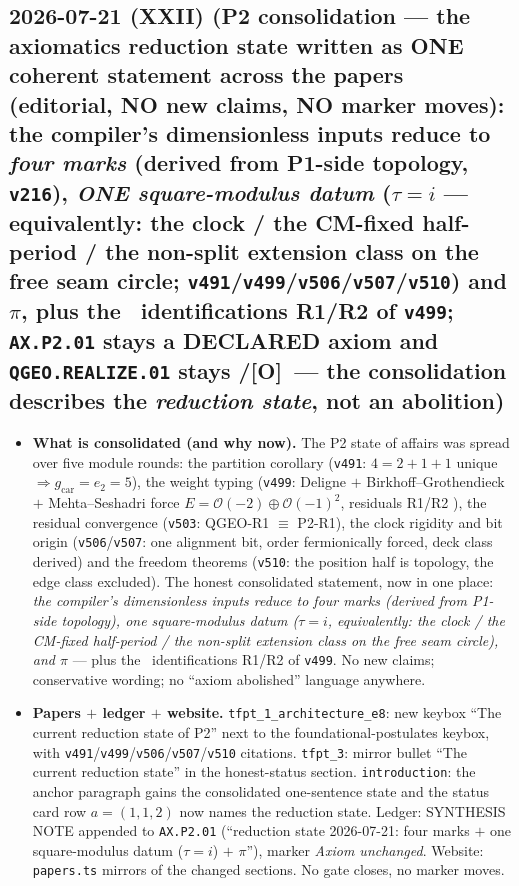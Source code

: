\documentclass[11pt]{article}
\providecommand{\mO}{\textbf{[O]}}\providecommand{\mX}{\textbf{[X]}}
\providecommand{\gcar}{g_{\mathrm{car}}}\providecommand{\Nfam}{N_{\mathrm{fam}}}
\begin{document}
\subsection*{2026-07-21 (XXII) (P2 consolidation --- the axiomatics reduction state written as ONE coherent statement across the papers (editorial, NO new claims, NO marker moves): the compiler's dimensionless inputs reduce to \emph{four marks} (derived from P1-side topology, \texttt{v216}), \emph{ONE square-modulus datum} ($\tau=i$ --- equivalently: the clock / the CM-fixed half-period / the non-split extension class on the free seam circle; \texttt{v491}/\texttt{v499}/\texttt{v506}/\texttt{v507}/\texttt{v510}) and $\pi$, plus the \mC\ identifications R1/R2 of \texttt{v499}; \texttt{AX.P2.01} stays a DECLARED axiom and \texttt{QGEO.REALIZE.01} stays \mC/\mO\ --- the consolidation describes the \emph{reduction state}, not an abolition)}
\begin{itemize}[leftmargin=1.5em]
\item \textbf{What is consolidated (and why now).} The P2 state of affairs was spread over five module rounds:
the partition corollary (\texttt{v491}: $4=2{+}1{+}1$ unique $\Rightarrow\gcar=e_2=5$), the weight
typing (\texttt{v499}: Deligne $+$ Birkhoff--Grothendieck $+$ Mehta--Seshadri force
$E=\mathcal O(-2){\oplus}\mathcal O(-1)^2$, residuals R1/R2 \mC), the residual convergence
(\texttt{v503}: QGEO-R1 $\equiv$ P2-R1), the clock rigidity and bit origin (\texttt{v506}/\texttt{v507}:
one alignment bit, order fermionically forced, deck class derived) and the freedom theorems
(\texttt{v510}: the position half is topology, the edge class excluded). The honest consolidated
statement, now in one place: \emph{the compiler's dimensionless inputs reduce to four marks (derived
from P1-side topology), one square-modulus datum ($\tau=i$, equivalently: the clock / the CM-fixed
half-period / the non-split extension class on the free seam circle), and $\pi$} --- plus the \mC\
identifications R1/R2 of \texttt{v499}. No new claims; conservative wording; no ``axiom abolished''
language anywhere.
\item \textbf{Papers $+$ ledger $+$ website.} \texttt{tfpt\_1\_architecture\_e8}: new keybox ``The
current reduction state of P2'' next to the foundational-postulates keybox, with
\texttt{v491}/\texttt{v499}/\texttt{v506}/\texttt{v507}/\texttt{v510} citations.
\texttt{tfpt\_3}: mirror bullet ``The current reduction state'' in the honest-status section.
\texttt{introduction}: the anchor paragraph gains the consolidated one-sentence state and the status
card row $a=(1,1,2)$ now names the reduction state. Ledger: SYNTHESIS NOTE appended to
\texttt{AX.P2.01} (``reduction state 2026-07-21: four marks $+$ one square-modulus datum ($\tau=i$)
$+$ $\pi$''), marker \emph{Axiom unchanged}. Website: \texttt{papers.ts} mirrors of the changed
sections. No gate closes, no marker moves.
\end{itemize}
\end{document}
